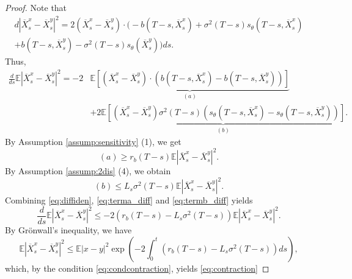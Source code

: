 \documentclass[letterpaper,11pt,reqno]{amsart}
\numberwithin{equation}{section}
\begin{document}
\begin{proof}
Note that
\begin{multline*}
d|\overline{X}^x_s - \overline{X}^y_s|^2
= 2 \left(\overline{X}^x_s - \overline{X}^y_s \right)\cdot
\bigg(-b(T-s, \overline{X}^x_s) + \sigma^2(T-s) s_\theta(T-s, \overline{X}^x_s)\\
+ b(T-s, \overline{X}^y_s) - \sigma^2(T-s) s_\theta(\overline{X}^y_s)\bigg) ds.
\end{multline*}
Thus, 
\begin{equation}
\label{eq:diffiden}
\begin{aligned}
\frac{d}{ds} \mathbb{E}|\overline{X}^x_s - \overline{X}^y_s|^2
= -2 & \underbrace{\mathbb{E}\left[(\overline{X}^x_s - \overline{X}^y_s) \cdot (b(T-s, \overline{X}^x_s) - b(T-s, \overline{X}^y_s))\right]}_{(a)} \\
& + 2 \underbrace{\mathbb{E}\left[(\overline{X}^x_s - \overline{X}^y_s) \sigma^2(T-s) 
(s_\theta(T-s, \overline{X}^x_s) - s_\theta(T-s,\overline{X}^y_s))\right]}_{(b)}.
\end{aligned}
\end{equation}
By Assumption \ref{assump:sensitivity} (1),
we get
\begin{equation}
\label{eq:terma_diff}
(a) \ge  r_b(T-s) \mathbb{E}|\overline{X}^x_s - \overline{X}^y_s|^2.
\end{equation}
By Assumption \ref{assump:2dis} (4), we obtain
\begin{equation}
\label{eq:termb_diff}
(b) \le L_s \sigma^2(T-s) \mathbb{E}|\overline{X}^x_s - \overline{X}^y_s|^2.
\end{equation}
Combining \eqref{eq:diffiden}, \eqref{eq:terma_diff} 
and \eqref{eq:termb_diff} yields
\begin{equation*}
\frac{d}{ds} \mathbb{E}|\overline{X}^x_s - \overline{X}^y_s|^2 
\le -2 (r_b(T-s) - L_s \sigma^2(T-s)) \mathbb{E}|\overline{X}^x_s - \overline{X}^y_s|^2.
\end{equation*}
By Gr\"onwall's inequality, we have
\begin{equation*}
\mathbb{E}|\overline{X}^x_s - \overline{X}^y_s|^2 
\le \mathbb{E}|x - y|^2 \exp \left(-2 \int_0^t (r_b(T-s) - L_s \sigma^2(T-s)) ds  \right),
\end{equation*}
which, by the condition \eqref{eq:condcontraction}, yields \eqref{eq:contraction}
\end{proof}
\end{document}
